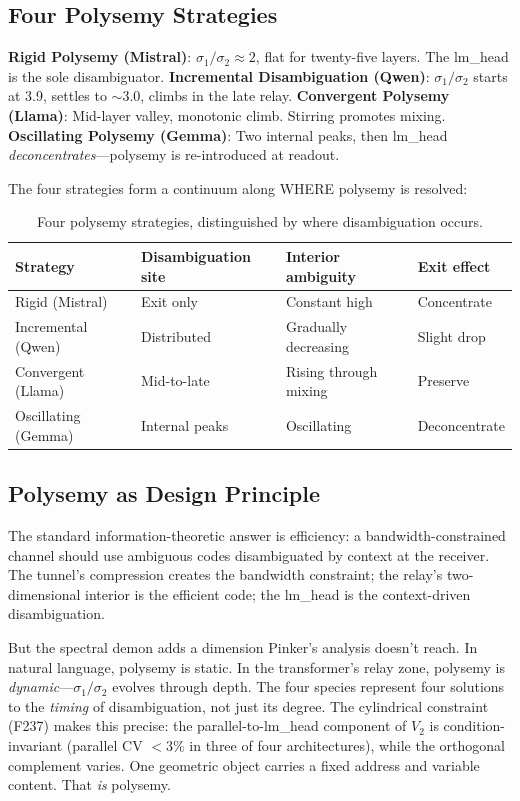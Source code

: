 \documentclass[12pt]{article}
\begin{document}
\subsection{Four Polysemy Strategies}

\textbf{Rigid Polysemy (Mistral)}: $\sigma_1/\sigma_2 \approx 2$, flat for twenty-five layers. The lm\_head is the sole disambiguator. \textbf{Incremental Disambiguation (Qwen)}: $\sigma_1/\sigma_2$ starts at 3.9, settles to ${\sim}3.0$, climbs in the late relay. \textbf{Convergent Polysemy (Llama)}: Mid-layer valley, monotonic climb. Stirring promotes mixing. \textbf{Oscillating Polysemy (Gemma)}: Two internal peaks, then lm\_head \emph{deconcentrates}---polysemy is re-introduced at readout.

The four strategies form a continuum along WHERE polysemy is resolved:

\begin{table}[h]
\centering
\begin{tabular}{llll}
\toprule
Strategy & Disambiguation site & Interior ambiguity & Exit effect \\
\midrule
Rigid (Mistral) & Exit only & Constant high & Concentrate \\
Incremental (Qwen) & Distributed & Gradually decreasing & Slight drop \\
Convergent (Llama) & Mid-to-late & Rising through mixing & Preserve \\
Oscillating (Gemma) & Internal peaks & Oscillating & Deconcentrate \\
\bottomrule
\end{tabular}
\caption{Four polysemy strategies, distinguished by where disambiguation occurs.}
\label{tab:polysemy}
\end{table}

\subsection{Polysemy as Design Principle}

The standard information-theoretic answer is efficiency: a bandwidth-constrained channel should use ambiguous codes disambiguated by context at the receiver. The tunnel's compression creates the bandwidth constraint; the relay's two-dimensional interior is the efficient code; the lm\_head is the context-driven disambiguation.

But the spectral demon adds a dimension Pinker's analysis doesn't reach. In natural language, polysemy is static. In the transformer's relay zone, polysemy is \emph{dynamic}---$\sigma_1/\sigma_2$ evolves through depth. The four species represent four solutions to the \emph{timing} of disambiguation, not just its degree. The cylindrical constraint (F237) makes this precise: the parallel-to-lm\_head component of $V_2$ is condition-invariant (parallel CV $< 3\%$ in three of four architectures), while the orthogonal complement varies. One geometric object carries a fixed address and variable content. That \emph{is} polysemy.
\end{document}
